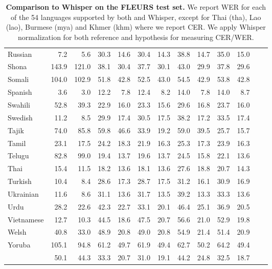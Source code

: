 {\begin{table}[h!]
\begin{scriptsize}
\begin{tabular}{lrrrrrrrrrrrr}
Russian & 7.2 & 5.6 & 30.3 & 14.6 & 30.4 & 14.3 & 38.8 & 14.7 & 35.0 & 15.0\\
Shona & 143.9 & 121.0 & 38.1 & 30.4 & 37.7 & 30.1 & 43.0 & 29.9 & 37.8 & 29.6\\
Somali & 104.0 & 102.9 & 51.8 & 42.8 & 52.5 & 43.0 & 54.5 & 42.9 & 53.8 & 42.8\\
Spanish & 3.6 & 3.0 & 12.2 & 7.8 & 12.4 & 8.2 & 14.0 & 7.8 & 14.0 & 8.7\\
Swahili & 52.8 & 39.3 & 22.9 & 16.0 & 23.3 & 15.6 & 29.6 & 16.8 & 23.7 & 16.0\\
Swedish & 11.2 & 8.5 & 29.9 & 17.4 & 30.5 & 17.5 & 38.2 & 17.2 & 33.5 & 17.4\\
Tajik & 74.0 & 85.8 & 59.8 & 46.6 & 33.9 & 19.2 & 59.0 & 39.5 & 25.7 & 15.7\\
Tamil & 23.1 & 17.5 & 24.2 & 18.3 & 21.9 & 16.3 & 25.3 & 17.3 & 23.9 & 16.3\\
Telugu & 82.8 & 99.0 & 19.4 & 13.7 & 19.6 & 13.7 & 24.5 & 15.8 & 22.1 & 13.6\\
Thai & 15.4 & 11.5 & 18.2 & 13.6 & 18.1 & 13.6 & 27.6 & 18.8 & 20.7 & 14.3\\
Turkish & 10.4 & 8.4 & 28.6 & 17.3 & 28.7 & 17.5 & 31.2 & 16.1 & 30.9 & 16.9\\
Ukrainian & 11.6 & 8.6 & 31.1 & 13.6 & 31.7 & 13.5 & 39.2 & 13.3 & 33.3 & 13.6\\
Urdu & 28.2 & 22.6 & 42.3 & 22.7 & 33.1 & 20.1 & 46.4 & 25.1 & 36.9 & 20.5\\
Vietnamese & 12.7 & 10.3 & 44.5 & 18.6 & 47.5 & 20.7 & 56.6 & 21.0 & 52.9 & 19.8\\
Welsh & 40.8 & 33.0 & 48.9 & 20.8 & 49.0 & 20.8 & 54.9 & 21.4 & 51.4 & 20.9\\
Yoruba & 105.1 & 94.8 & 61.2 & 49.7 & 61.9 & 49.4 & 62.7 & 50.2 & 64.2 & 49.4\\
\midrule 
& 50.1 & 44.3 & 33.3 & 20.7 & 31.0 & 19.1 & 44.2 & 24.8 & 32.5 & 18.7\\
\bottomrule
\end{tabular}
\end{scriptsize}
\vspace{1mm}
\caption{
\textbf{Comparison to Whisper on the FLEURS test set.}
We report WER for each of the 54 languages supported by both \modelname{} and Whisper, except for Thai (tha), Lao (lao), Burmese (mya) and Khmer (khm) where we report CER. 
We apply Whisper normalization for both reference and hypothesis for measuring CER/WER.
} 
\label{tab:asr-whisper-perlang-test} 
\end{table}
}


